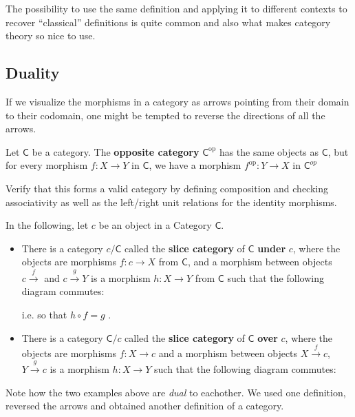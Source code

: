 The possibility to use the same definition and applying it to different contexts to recover ``classical'' definitions is quite common and also what makes category theory so nice to use.

\subsection{Duality}

If we visualize the morphisms in a category as arrows pointing from their domain to their codomain, one might be tempted to reverse the directions of all the arrows.

\begin{dfn}[]
Let $\textsf{C}$ be a category. The \textbf{opposite category} $\textsf{C}^{\text{op}}$ has the same objects as $\textsf{C}$, but for every morphism $f: X \to Y$ in $\textsf{C}$, we have a morphism $f^{\text{op}}: Y \to X$ in $\textsf{C}^{op}$
\end{dfn}
Verify that this forms a valid category by defining composition and checking associativity as well as the left/right unit relations for the identity morphisms.

\begin{dfn}[]
  In the following, let $c$ be an object in a Category $\textsf{C}$.
  \begin{itemize}
    \item There is a category $c/\textsf{C}$ called the \textbf{slice category} of $\textsf{C}$ \textbf{under} $c$, where the objects are morphisms $f: c \to X$ from $\textsf{C}$, 
      and a morphism between objects $c \stackrel{f}{\to}$ and $c \stackrel{g}{\to}Y$ is a morphism $h: X \to Y$ from $\textsf{C}$ such that the following diagram commutes:
      \begin{center}
      \end{center}
      i.e. so that $h \circ f = g$ .
    \item There is a category $\textsf{C}/c$ called the \textbf{slice category} of $\textsf{C}$ \textbf{over} $c$, where the objects are morphisms $f: X \to c$ and a morphism between objects $X \stackrel{f}{\to}c$, $Y \stackrel{g}{\to}c$ is a morphism $h: X \to Y$ such that the following diagram commutes:
      \begin{center}
      \end{center}
  \end{itemize}
  Note how the two examples above are \emph{dual} to eachother. We used one definition, reversed the arrows and obtained another definition of a category.
\end{dfn}

